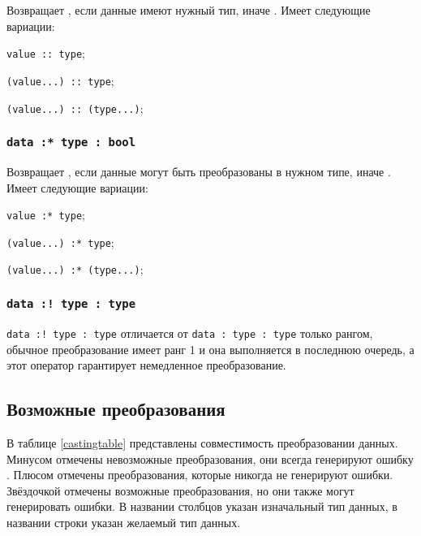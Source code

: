 Возвращает \true, если данные имеют нужный тип, иначе \false. Имеет следующие вариации:
\begin{icItems}
	\item \texttt{value :: type};
	\item \texttt{(value...) :: type};
	\item \texttt{(value...) :: (type...)};
\end{icItems}

\subsubsection{\texttt{data :* type : bool}}

Возвращает \true, если данные могут быть преобразованы в нужном типе, иначе \false. Имеет следующие вариации:
\begin{icItems}
	\item \texttt{value :* type};
	\item \texttt{(value...) :* type};
	\item \texttt{(value...) :* (type...)};
\end{icItems}

\subsubsection{\texttt{data :! type : type}}

\texttt{data :! type : type} отличается от \texttt{data : type : type} только рангом, обычное преобразование имеет ранг 1 и она выполняется в последнюю очередь, а этот оператор гарантирует немедленное преобразование.

\subsection{Возможные преобразования}

В таблице \ref{castingtable} представлены совместимость преобразовании данных. Минусом отмечены невозможные преобразования, они всегда генерируют ошибку . Плюсом отмечены преобразования, которые никогда не генерируют ошибки. Звёздочкой отмечены возможные преобразования, но они также могут генерировать ошибки. В названии столбцов указан изначальный тип данных, в названии строки указан желаемый тип данных.

